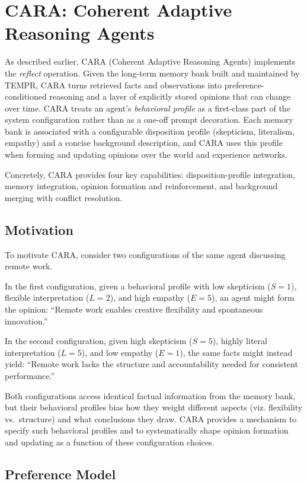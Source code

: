 \section{CARA: Coherent Adaptive Reasoning Agents}
\label{sec:cara}
As described earlier, CARA (Coherent Adaptive Reasoning Agents) implements the \emph{reflect} operation. Given
the long-term memory bank built and
maintained by TEMPR,
CARA turns retrieved facts and observations into preference-conditioned reasoning and a layer of explicitly stored opinions that can change over time.
CARA treats an agent's \emph{behavioral profile} as a first-class part of the system configuration rather than as a one-off prompt decoration. Each memory bank is associated with a configurable disposition profile (skepticism, literalism, empathy) and a concise background description, and CARA uses this profile when forming and updating opinions over the world and experience networks.

Concretely, CARA provides four key capabilities: disposition-profile integration, \our memory integration, opinion formation and reinforcement, and background merging with conflict resolution.

\subsection{Motivation}

To motivate CARA, consider two configurations of the same agent discussing remote work. 

In the first configuration, given a behavioral profile with low skepticism ($S = 1$), flexible interpretation ($L = 2$), and high empathy ($E = 5$), an agent might form the opinion: ``Remote work enables creative flexibility and spontaneous innovation.'' 

In the second configuration, given high skepticism ($S = 5$), highly literal interpretation ($L = 5$), and low empathy ($E = 1$), the same facts might instead yield: ``Remote work lacks the structure and accountability needed for consistent performance.''

Both configurations access identical factual information from the \our memory bank, but their behavioral profiles bias how they weight different aspects (viz. flexibility vs.\ structure) and what conclusions they draw. CARA provides a mechanism to specify such behavioral profiles and to systematically shape opinion formation and updating as a function of these configuration choices.

\subsection{Preference Model}

